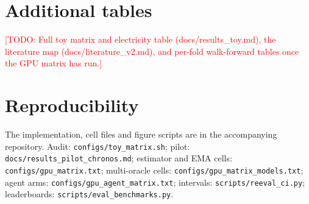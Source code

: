\documentclass{article}
\newcommand{\todo}[1]{\textcolor{red}{[TODO: #1]}}
\begin{document}
\section{Additional tables}
\todo{Full toy matrix and electricity table (docs/results\_toy.md), the literature map (docs/literature\_v2.md), and per-fold walk-forward tables once the GPU matrix has run.}

\section{Reproducibility}
The implementation, cell files and figure scripts are in the accompanying repository. Audit: \texttt{configs/toy\_matrix.sh}; pilot: \texttt{docs/results\_pilot\_chronos.md}; estimator and EMA cells: \texttt{configs/gpu\_matrix.txt}; multi-oracle cells: \texttt{configs/gpu\_matrix\_models.txt}; agent arms: \texttt{configs/gpu\_agent\_matrix.txt}; intervals: \texttt{scripts/reeval\_ci.py}; leaderboards: \texttt{scripts/eval\_benchmarks.py}.
\end{document}
